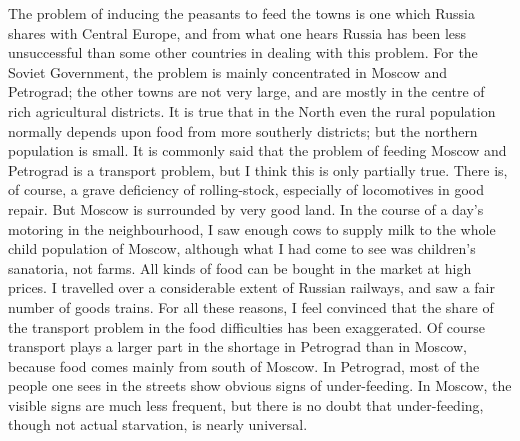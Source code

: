 The problem of inducing the peasants to feed the towns is one which Russia shares with Central Europe, and from what one hears Russia has been less unsuccessful than some other countries in dealing with this problem. For the Soviet Government, the problem is mainly concentrated in Moscow and Petrograd; the other towns are not very large, and are mostly in the centre of rich agricultural districts. It is true that in the North even the rural population normally depends upon food from more southerly districts; but the northern population is small. It is commonly said that the problem of feeding Moscow and Petrograd is a transport problem, but I think this is only partially true. There is, of course, a grave deficiency of rolling-stock, especially of locomotives in good repair. But Moscow is surrounded by very good land. In the course of a day's motoring in the neighbourhood, I saw enough cows to supply milk to the whole child population of Moscow, although what I had come to see was children's sanatoria, not farms. All kinds of food can be bought in the market at high prices. I travelled over a considerable extent of Russian railways, and saw a fair number of goods trains. For all these reasons, I feel convinced that the share of the transport problem in the food difficulties has been exaggerated. Of course transport plays a larger part in the shortage in Petrograd than in Moscow, because food comes mainly from south of Moscow. In Petrograd, most of the people one sees in the streets show obvious signs of under-feeding. In Moscow, the visible signs are much less frequent, but there is no doubt that under-feeding, though not actual starvation, is nearly universal.

